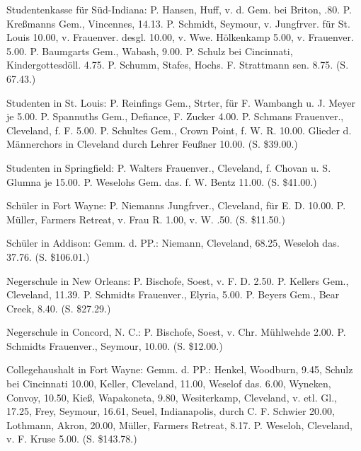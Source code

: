 Studentenkasse für Süd-Indiana: P. Hansen, Huff, v. d. Gem. bei Briton, .80. P. Kreßmanns Gem., Vincennes, 14.13. P. Schmidt, Seymour, v. Jungfrver. für St. Louis 10.00, v. Frauenver. desgl. 10.00, v. Wwe. Hölkenkamp 5.00, v. Frauenver. 5.00. P. Baumgarts Gem., Wabash, 9.00. P. Schulz bei Cincinnati, Kindergottesdöll. 4.75. P. Schumm, Stafes, Hochs. F. Strattmann sen. 8.75. (S. 67.43.)

Studenten in St. Louis: P. Reinfings Gem., Strter, für F. Wambangh u. J. Meyer je 5.00. P. Spannuths Gem., Defiance, F. Zucker 4.00. P. Schmans Frauenver., Cleveland, f. F. 5.00. P. Schultes Gem., Crown Point, f. W. R. 10.00. Glieder d. Männerchors in Cleveland durch Lehrer Feußner 10.00. (S. \$39.00.)

Studenten in Springfield: P. Walters Frauenver., Cleveland, f. Chovan u. S. Glumna je 15.00. P. Weselohs Gem. das. f. W. Bentz 11.00. (S. \$41.00.)

Schüler in Fort Wayne: P. Niemanns Jungfrver., Cleveland, für E. D. 10.00. P. Müller, Farmers Retreat, v. Frau R. 1.00, v. W. .50. (S. \$11.50.)

Schüler in Addison: Gemm. d. PP.: Niemann, Cleveland, 68.25, Weseloh das. 37.76. (S. \$106.01.)

Negerschule in New Orleans: P. Bischofe, Soest, v. F. D. 2.50. P. Kellers Gem., Cleveland, 11.39. P. Schmidts Frauenver., Elyria, 5.00. P. Beyers Gem., Bear Creek, 8.40. (S. \$27.29.)

Negerschule in Concord, N. C.: P. Bischofe, Soest, v. Chr. Mühlwehde 2.00. P. Schmidts Frauenver., Seymour, 10.00. (S. \$12.00.)

Collegehaushalt in Fort Wayne: Gemm. d. PP.: Henkel, Woodburn, 9.45, Schulz bei Cincinnati 10.00, Keller, Cleveland, 11.00, Weselof das. 6.00, Wyneken, Convoy, 10.50, Kieß, Wapakoneta, 9.80, Wesiterkamp, Cleveland, v. etl. Gl., 17.25, Frey, Seymour, 16.61, Seuel, Indianapolis, durch C. F. Schwier 20.00, Lothmann, Akron, 20.00, Müller, Farmers Retreat, 8.17. P. Weseloh, Cleveland, v. F. Kruse 5.00. (S. \$143.78.)

